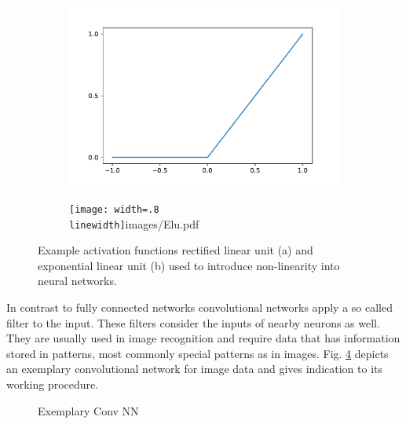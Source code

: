 			\begin{figure}
				\begin{subfigure}{.49\textwidth}
					\centering
					\includegraphics[width=0.8*\linewidth]{images/ReLU.pdf}
					\label{ReLU}
				\end{subfigure}
				\begin{subfigure}{.49\textheight}
					\centering
					\texttt{[image: width=.8\\linewidth]}{images/Elu.pdf}
					\label{ELU}
				\end{subfigure}
				\caption{Example activation functions rectified linear unit (a) and  exponential linear unit (b) used to introduce non-linearity into neural networks.}
				\label{ReLUELU}
			\end{figure}
		
			In contrast to fully connected networks convolutional networks apply a so called filter to the input. These filters consider the inputs of nearby neurons as well. They are usually used in image recognition and require data that has information stored in patterns, most commonly special patterns as in images. Fig. \ref{Img_NNConv} depicts an exemplary convolutional network for image data and gives indication to its working procedure.
		
			\begin{figure}
				\caption{Exemplary Conv NN}
				\label{Img_NNConv}
			\end{figure}
		

